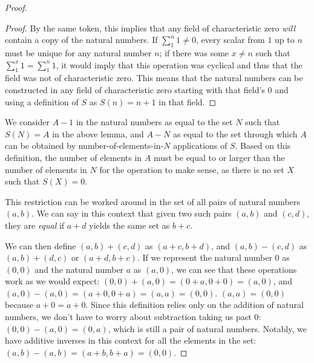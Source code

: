 \documentclass[12pt]{article}
\begin{document}
\begin{enumerate}
\begin{thm}
\begin{proof}
\begin{lemma}
\begin{proof}
            By the same token, this implies that any field of
            characteristic zero \textit{will} contain a copy of
            the natural numbers. If $\sum_{1}^{n}1 \neq 0$, every
            scalar from $1$ up to $n$ must be unique for any
            natural number $n$; if there was some $x \neq n$ such
            that $\sum_{1}^{x}1 = \sum_{1}^{n}1$, it would imply
            that this operation was cyclical and thus that the
            field was not of characteristic zero. This means that
            the natural numbers can be constructed in any field
            of characteristic zero starting with that field's $0$
            and using a definition of $S$ as $S(n) = n + 1$ in
            that field.
          \end{proof}
        \end{lemma}

        We consider $A - 1$ in the natural numbers as equal to
        the set $N$ such that $S(N) = A$ in the above lemma, and
        $A - N$ as equal to the set through which $A$ can be
        obtained by number-of-elements-in-$N$ applications of
        $S$. Based on this definition, the number of elements in
        $A$ must be equal to or larger than the number of
        elements in $N$ for the operation to make sense, as there
        is no set $X$ such that $S(X) = 0$.

        This restriction can be worked around in the set of all
        pairs of natural numbers $(a,b)$. We can say in this
        context that given two such pairs $(a,b)$ and $(c,d)$,
        they are \textit{equal} if $a + d$ yields the same set as
        $b + c$.

        We can then define $(a,b) + (c,d)$ as $(a + c, b + d)$,
        and $(a,b) - (c,d)$ as $(a,b) + (d,c)$ or $(a + d, b +
        c)$. If we represent the natural number $0$ as $(0,0)$
        and the natural number $a$ as $(a,0)$, we can see that
        these operations work as we would expect: $(0,0) + (a,0)
        = (0 + a, 0 + 0) = (a,0)$, and $(a,0) - (a,0) = (a + 0, 0
        + a) = (a,a) = (0,0)$. $(a,a) = (0,0)$ because $a + 0 = a
        + 0$. Since this definition relies only on the addition
        of natural numbers, we don't have to worry about
        subtraction taking us past $0$: $(0,0) - (a,0) = (0,a)$,
        which is still a pair of natural numbers. Notably, we
        have additive inverses in this context for all the
        elements in the set: $(a,b) - (a,b) = (a + b, b + a) =
        (0,0)$.


\end{proof}
\end{thm}
\end{enumerate}
\end{document}
